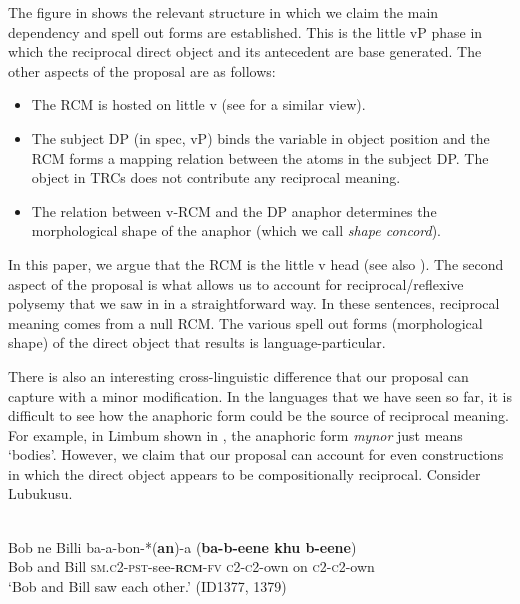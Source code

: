 \documentclass[output=paper]{langsci/langscibook}
\begin{document}
 


 



The figure in  shows the relevant structure in which we claim the main dependency and spell out forms are established. This is the little vP phase in which the reciprocal direct object and its antecedent are base generated. The other aspects of the proposal are as follows:


\begin{itemize}
\item The RCM is hosted on little v (see \citealt{Bruening2006} for a similar view).

\item The subject DP (in spec, vP) binds the variable in object position and the RCM forms a mapping relation between the atoms in the subject DP. The object in TRCs does not contribute any reciprocal meaning.

\item The relation between v-RCM and the DP anaphor determines the morphological shape of the anaphor (which we call \textit{shape concord}).

\end{itemize}

In this paper, we argue that the RCM is the little v head (see also \citealt{BakerEtAl2013}). The second aspect of the proposal is what allows us to account for reciprocal/reflexive polysemy that we saw in  in a straightforward way. In these sentences, reciprocal meaning comes from a null RCM. The various spell out forms (morphological shape) of the direct object that results is language-particular. 

  There is also an interesting cross-linguistic difference that our proposal can capture with a minor modification. In the languages that we have seen so far, it is difficult to see how the anaphoric form could be the source of reciprocal meaning. For example, in Limbum shown in , the anaphoric form \textit{mynor} just means ‘bodies’. However, we claim that our proposal can account for even constructions in which the direct object appears to be compositionally reciprocal. Consider Lubukusu.



\ea\label{ex:}
\\
\gll Bob  ne  Billi  ba-a-bon-*(\textbf{an})-a     (\textbf{ba-b-eene  khu b-eene}) \\
Bob   and   Bill   \textsc{sm.c2-pst}-see-\textbf{\textsc{rcm}}\textsc{-fv}   \textsc{c2-c2}-own on \textsc{c2-c2}-own \\
\glt ‘Bob and Bill saw each other.’  (ID1377, 1379) 
\z
\end{document}
